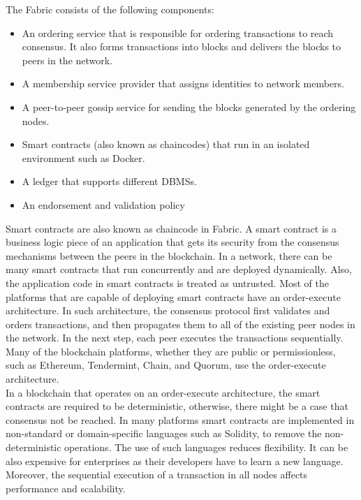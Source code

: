 \documentclass[sigconf,natbib=false]{acmart}
\begin{document}
    The Fabric consists of the following components:\cite{hyperledgerIntroduction}
    \begin{itemize}
        \item An ordering service that is responsible for ordering transactions to reach consensus. It also forms transactions into blocks and delivers the blocks to peers in the network.
        \item A  membership service provider that assigns identities to network members.
        \item A peer-to-peer gossip service for sending the blocks generated by the ordering nodes.
        \item Smart contracts (also known as chaincodes) that run in an isolated environment such as Docker.
        \item A ledger that supports different DBMSs.
        \item An endorsement and validation policy
    \end{itemize}
    Smart contracts are also known as chaincode in Fabric. A smart contract is a business logic piece of an application that gets its security from the consensus mechanisms between the peers in the blockchain. In a network, there can be many smart contracts that run concurrently and are deployed dynamically. Also, the application code in smart contracts is treated as untrusted. Most of the platforms that are capable of deploying smart contracts have an order-execute architecture. In such architecture, the consensus protocol first validates and orders transactions, and then propagates them to all of the existing peer nodes in the network. In the next step, each peer executes the transactions sequentially. Many of the blockchain platforms, whether they are public or permissionless, such as Ethereum, Tendermint, Chain, and Quorum, use the order-execute architecture.\cite{hyperledgerIntroduction}\\
    In a blockchain that operates on an order-execute architecture, the smart contracts are required to be deterministic, otherwise, there might be a case that consensus not be reached. In many platforms smart contracts are implemented in non-standard or domain-specific languages such as Solidity, to remove the non-deterministic operations. The use of such languages reduces flexibility. It can be also expensive for enterprises as their developers have to learn a new language. Moreover, the sequential execution of a transaction in all nodes affects performance and scalability.\\
\end{document}

